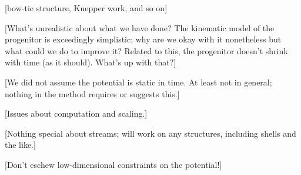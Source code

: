 \documentclass[letterpaper,12pt,preprint]{aastex}
\begin{document}
[bow-tie structure, Kuepper work, and so on]

[What's unrealistic about what we have done?  The kinematic model of
  the progenitor is exceedingly simplistic; why are we okay with it
  nonetheless but what could we do to improve it?  Related to this,
  the progenitor doesn't shrink with time (as it should).  What's up
  with that?]

[We did not assume the potential is static in time.  At least not in
  general; nothing in the method requires or suggests this.]

[Issues about computation and scaling.]

[Nothing special about streams; will work on any structures, including
  shells and the like.]

[Don't eschew low-dimensional constraints on the potential!]




\acknowledgements
\end{document}

